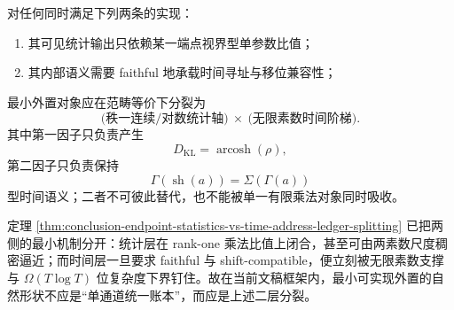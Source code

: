 \begin{conjecture}\label{conj:conclusion-minimal-externalization-rankone-statistics-infinite-prime-time}
对任何同时满足下列两条的实现：
\begin{enumerate}
  \item 其可见统计输出只依赖某一端点视界型单参数比值；
  \item 其内部语义需要 faithful 地承载时间寻址与移位兼容性；
\end{enumerate}
最小外置对象应在范畴等价下分裂为
\[
\text{(秩一连续/对数统计轴)}
\ \times\
\text{(无限素数时间阶梯)}.
\]
其中第一因子只负责产生
\[
D_{\mathrm{KL}}=\operatorname{arcosh}(\rho),
\]
第二因子只负责保持
\[
\Gamma(\operatorname{sh}(a))=\Sigma(\Gamma(a))
\]
型时间语义；二者不可彼此替代，也不能被单一有限乘法对象同时吸收。
\end{conjecture}

\begin{remark}[支持性证据]\label{rem:conclusion-rankone-statistics-vs-prime-ladder-time-evidence}
定理 \ref{thm:conclusion-endpoint-statistics-vs-time-address-ledger-splitting} 已把两侧的最小机制分开：统计层在 rank-one 乘法比值上闭合，甚至可由两素数尺度稠密逼近；而时间层一旦要求 faithful 与 shift-compatible，便立刻被无限素数支撑与 \(\Omega(T\log T)\) 位复杂度下界钉住。故在当前文稿框架内，最小可实现外置的自然形状不应是“单通道统一账本”，而应是上述二层分裂。
\end{remark}

\endinput
